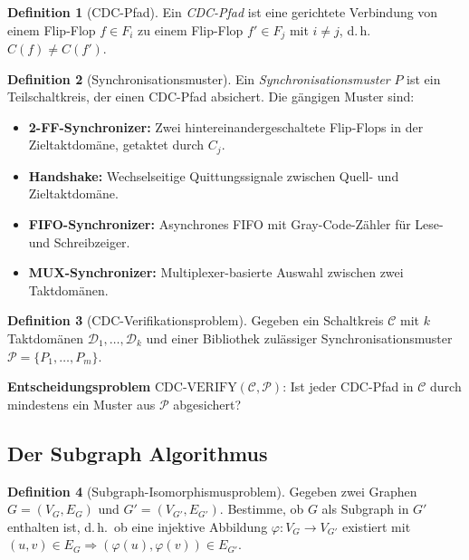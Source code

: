 ﻿\documentclass[a4paper,12pt]{article}
\theoremstyle{definition}
\newtheorem{definition}{Definition}
\begin{document}
	\begin{definition}[CDC-Pfad]
		Ein \emph{CDC-Pfad} ist eine gerichtete Verbindung von einem Flip-Flop
		$f \in F_i$ zu einem Flip-Flop $f' \in F_j$ mit $i \neq j$, d.\,h.\
		$C(f) \neq C(f')$.
	\end{definition}
	
	\begin{definition}[Synchronisationsmuster]
		Ein \emph{Synchronisationsmuster} $P$ ist ein Teilschaltkreis, der einen
		CDC-Pfad absichert. Die g\"angigen Muster sind:
		\begin{itemize}
			\item \textbf{2-FF-Synchronizer:} Zwei hintereinandergeschaltete Flip-Flops
			in der Zieltaktdom\"ane, getaktet durch $C_j$.
			\item \textbf{Handshake:} Wechselseitige Quittungssignale zwischen
			Quell- und Zieltaktdom\"ane.
			\item \textbf{FIFO-Synchronizer:} Asynchrones FIFO mit Gray-Code-Z\"ahler
			f\"ur Lese- und Schreibzeiger.
			\item \textbf{MUX-Synchronizer:} Multiplexer-basierte Auswahl zwischen
			zwei Taktdom\"anen.
		\end{itemize}
	\end{definition}
	
	\begin{definition}[CDC-Verifikationsproblem]
		\label{def:cdcverify}
		Gegeben ein Schaltkreis $\mathcal{C}$ mit $k$ Taktdom\"anen $\mathcal{D}_1, \ldots, \mathcal{D}_k$
		und einer Bibliothek zul\"assiger Synchronisationsmuster
		$\mathcal{P} = \{P_1, \ldots, P_m\}$.
		
		\textbf{Entscheidungsproblem} $\mathrm{CDC\text{-}VERIFY}(\mathcal{C}, \mathcal{P})$:
		Ist jeder CDC-Pfad in $\mathcal{C}$ durch mindestens ein Muster aus $\mathcal{P}$
		abgesichert?
	\end{definition}
	
	\subsection{Der Subgraph Algorithmus}
	
	\begin{definition}[Subgraph-Isomorphismusproblem]
		Gegeben zwei Graphen $G = (V_G, E_G)$ und $G' = (V_{G'}, E_{G'})$.
		Bestimme, ob $G$ als Subgraph in $G'$ enthalten ist, d.\,h.\ ob eine
		injektive Abbildung $\varphi: V_G \to V_{G'}$ existiert mit
		$(u, v) \in E_G \Rightarrow (\varphi(u), \varphi(v)) \in E_{G'}$.
	\end{definition}
	
\end{document}
